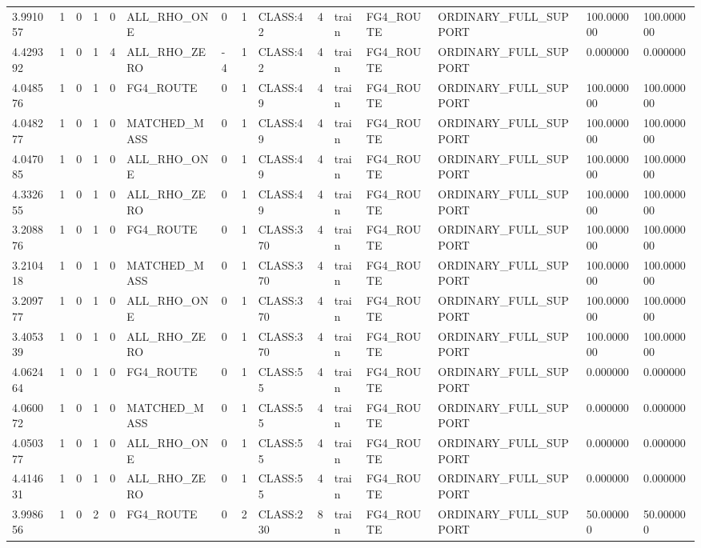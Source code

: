 \begin{tabular}{lllllllllllllll}
3.991057 & 1 & 0 & 1 & 0 & ALL\_RHO\_ONE & 0 & 1 & CLASS:42 & 4 & train & FG4\_ROUTE & ORDINARY\_FULL\_SUPPORT & 100.000000 & 100.000000 \\
4.429392 & 1 & 0 & 1 & 4 & ALL\_RHO\_ZERO & -4 & 1 & CLASS:42 & 4 & train & FG4\_ROUTE & ORDINARY\_FULL\_SUPPORT & 0.000000 & 0.000000 \\
4.048576 & 1 & 0 & 1 & 0 & FG4\_ROUTE & 0 & 1 & CLASS:49 & 4 & train & FG4\_ROUTE & ORDINARY\_FULL\_SUPPORT & 100.000000 & 100.000000 \\
4.048277 & 1 & 0 & 1 & 0 & MATCHED\_MASS & 0 & 1 & CLASS:49 & 4 & train & FG4\_ROUTE & ORDINARY\_FULL\_SUPPORT & 100.000000 & 100.000000 \\
4.047085 & 1 & 0 & 1 & 0 & ALL\_RHO\_ONE & 0 & 1 & CLASS:49 & 4 & train & FG4\_ROUTE & ORDINARY\_FULL\_SUPPORT & 100.000000 & 100.000000 \\
4.332655 & 1 & 0 & 1 & 0 & ALL\_RHO\_ZERO & 0 & 1 & CLASS:49 & 4 & train & FG4\_ROUTE & ORDINARY\_FULL\_SUPPORT & 100.000000 & 100.000000 \\
3.208876 & 1 & 0 & 1 & 0 & FG4\_ROUTE & 0 & 1 & CLASS:370 & 4 & train & FG4\_ROUTE & ORDINARY\_FULL\_SUPPORT & 100.000000 & 100.000000 \\
3.210418 & 1 & 0 & 1 & 0 & MATCHED\_MASS & 0 & 1 & CLASS:370 & 4 & train & FG4\_ROUTE & ORDINARY\_FULL\_SUPPORT & 100.000000 & 100.000000 \\
3.209777 & 1 & 0 & 1 & 0 & ALL\_RHO\_ONE & 0 & 1 & CLASS:370 & 4 & train & FG4\_ROUTE & ORDINARY\_FULL\_SUPPORT & 100.000000 & 100.000000 \\
3.405339 & 1 & 0 & 1 & 0 & ALL\_RHO\_ZERO & 0 & 1 & CLASS:370 & 4 & train & FG4\_ROUTE & ORDINARY\_FULL\_SUPPORT & 100.000000 & 100.000000 \\
4.062464 & 1 & 0 & 1 & 0 & FG4\_ROUTE & 0 & 1 & CLASS:55 & 4 & train & FG4\_ROUTE & ORDINARY\_FULL\_SUPPORT & 0.000000 & 0.000000 \\
4.060072 & 1 & 0 & 1 & 0 & MATCHED\_MASS & 0 & 1 & CLASS:55 & 4 & train & FG4\_ROUTE & ORDINARY\_FULL\_SUPPORT & 0.000000 & 0.000000 \\
4.050377 & 1 & 0 & 1 & 0 & ALL\_RHO\_ONE & 0 & 1 & CLASS:55 & 4 & train & FG4\_ROUTE & ORDINARY\_FULL\_SUPPORT & 0.000000 & 0.000000 \\
4.414631 & 1 & 0 & 1 & 0 & ALL\_RHO\_ZERO & 0 & 1 & CLASS:55 & 4 & train & FG4\_ROUTE & ORDINARY\_FULL\_SUPPORT & 0.000000 & 0.000000 \\
3.998656 & 1 & 0 & 2 & 0 & FG4\_ROUTE & 0 & 2 & CLASS:230 & 8 & train & FG4\_ROUTE & ORDINARY\_FULL\_SUPPORT & 50.000000 & 50.000000 \\

\end{tabular}
